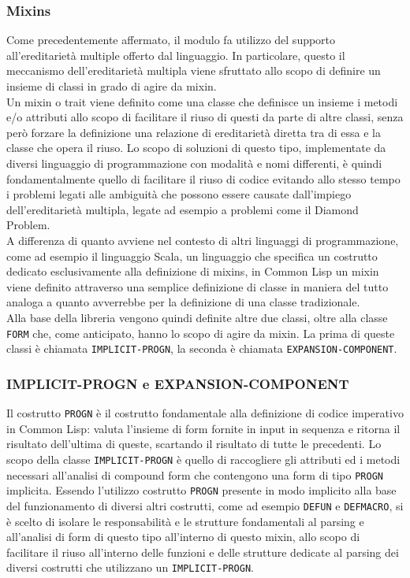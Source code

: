 \subsubsection{Mixins}

Come precedentemente affermato, il modulo fa utilizzo del supporto
all'ereditarietà multiple offerto dal linguaggio. In particolare, questo il
meccanismo dell'ereditarietà multipla viene sfruttato allo scopo di definire
un insieme di classi in grado di agire da mixin.\\

Un mixin o trait viene definito come una classe che definisce un insieme i
metodi e/o attributi allo scopo di facilitare il riuso di questi da parte di
altre classi, senza però forzare la definizione una relazione di ereditarietà
diretta tra di essa e la classe che opera il riuso. Lo scopo di soluzioni di
questo tipo, implementate da diversi linguaggio di programmazione con modalità
e nomi differenti, è quindi fondamentalmente quello di facilitare il riuso di
codice evitando allo stesso tempo i problemi legati alle ambiguità che possono
essere causate dall’impiego dell’ereditarietà multipla, legate ad esempio a
problemi come il Diamond Problem\cite{martin1997}.\\

A differenza di quanto avviene nel contesto di altri linguaggi di
programmazione, come ad esempio il linguaggio Scala, un linguaggio che
specifica un costrutto dedicato esclusivamente alla definizione di mixins, in
Common Lisp un mixin viene definito attraverso una semplice definizione di
classe in maniera del tutto analoga a quanto avverrebbe per la definizione di
una classe tradizionale.\\

Alla base della libreria vengono quindi definite altre due classi, oltre alla
classe \texttt{FORM} che, come anticipato, hanno lo scopo di agire da mixin.
La prima di queste classi è chiamata \texttt{IMPLICIT-PROGN}, la seconda è
chiamata \texttt {EXPANSION-COMPONENT}.

\subsubsection{IMPLICIT-PROGN e EXPANSION-COMPONENT}

Il costrutto \texttt{PROGN} è il costrutto fondamentale alla definizione di
codice imperativo in Common Lisp: valuta l’insieme di form fornite in input in
sequenza e ritorna il risultato dell’ultima di queste, scartando il risultato
di tutte le precedenti. Lo scopo della classe \texttt{IMPLICIT-PROGN} è quello
di raccogliere gli attributi ed i metodi necessari all’analisi di compound
form che contengono una form di tipo \texttt{PROGN} implicita. Essendo
l’utilizzo costrutto \texttt{PROGN} presente in modo implicito alla base del
funzionamento di diversi altri costrutti, come ad esempio \texttt{DEFUN} e
\texttt{DEFMACRO}, si è scelto di isolare le responsabilità e le strutture
fondamentali al parsing e all’analisi di form di questo tipo all’interno di
questo mixin, allo scopo di facilitare il riuso all’interno delle funzioni e
delle strutture dedicate al parsing dei diversi costrutti che utilizzano un
\texttt{IMPLICIT-PROGN}.

